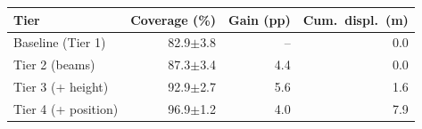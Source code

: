 \begin{tabular}{@{}lrrr@{}}
\toprule
Tier & Coverage (\%) & Gain (pp) & Cum.\ displ.\ (m)\\
\midrule
Baseline (Tier 1) & 82.9$\pm$3.8 & -- & 0.0 \\
Tier 2 (beams) & 87.3$\pm$3.4 & 4.4 & 0.0 \\
Tier 3 (+ height) & 92.9$\pm$2.7 & 5.6 & 1.6 \\
Tier 4 (+ position) & 96.9$\pm$1.2 & 4.0 & 7.9 \\
\bottomrule
\end{tabular}
